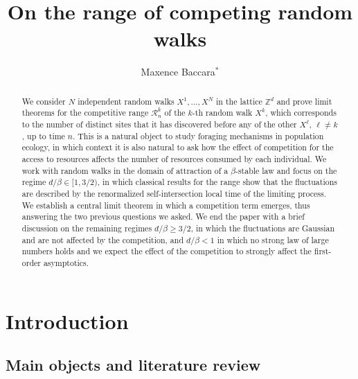 \documentclass[12pt]{article}
\title{On the range of competing random walks}
\author{Maxence Baccara$^*$}
\newcommand{\R}{\mathcal R}
\newcommand{\1}{\mathds{1}}
\newcommand{\ZZ}{\mathbb Z}
\numberwithin{equation}{section}
\begin{document}
\maketitle
\let\thefootnote\relax{}

\begin{abstract}
    We consider $N$ independent random walks $X^1,\dots,X^N$ in the lattice $\ZZ^d$ and prove limit theorems for the competitive range $\R_n^k$ of the $k$-th random walk $X^k$, which corresponds to the number of distinct sites that it has discovered before any of the other $X^\ell$, $\ell\ne k$, up to time $n$. This is a natural object to study foraging mechanisms in population ecology, in which context it is also natural to ask how the effect of competition for the access to resources affects the number of resources consumed by each individual. We work with random walks in the domain of attraction of a $\beta$-stable law and focus on the regime $d/\beta\in[1,3/2)$, in which classical results for the range show that the fluctuations are described by the renormalized self-intersection local time of the limiting process. We establish a central limit theorem in which a competition term emerges, thus answering the two previous questions we asked. We end the paper with a brief discussion on the remaining regimes $d/\beta\ge3/2$, in which the fluctuations are Gaussian and are not affected by the competition, and $d/\beta<1$ in which no strong law of large numbers holds and we expect the effect of the competition to strongly affect the first-order asymptotics.
\end{abstract}

\tableofcontents

\section{Introduction}

\subsection{Main objects and literature review}
\end{document}
